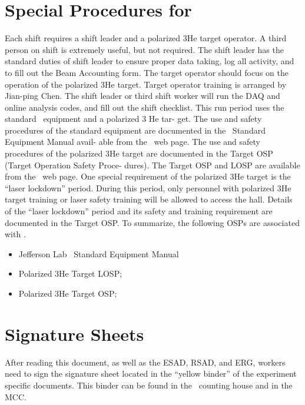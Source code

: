 %
%
\section{Special Procedures for \EXPTS}
Each shift requires a shift leader and a polarized 3He target operator. A third
person on shift is extremely useful, but not required. The shift leader has the
standard duties of shift leader to ensure proper data taking, log all activity, and
to fill out the Beam Accounting form. The target operator should focus on the
operation of the polarized 3He target. Target operator training is arranged by
Jian-ping Chen. The shift leader or third shift worker will run the DAQ and
online analysis codes, and fill out the shift checklist.
This run period uses the standard \HALL\ equipment and a polarized 3 He tar-
get. The use and safety procedures of the standard
equipment are documented in the \HALL\ Standard Equipment Manual avail-
able from the \HALL\ web page. The use and safety procedures of the polarized
3He target are documented in the Target OSP (Target Operation Safety Proce-
dures).  The Target OSP and LOSP are  available from the \HALL\ web page.
One special requirement of the polarized 3He target is the ``laser lockdown''
period. During this period, only personnel with polarized 3He target training
or laser safety training will be allowed to access the hall. Details of the ``laser
lockdown'' period and its safety and training requirement are documented in
the Target OSP.
To summarize, the following OSPs are associated with \EXPTS.

\begin{itemize}
\item Jefferson Lab \HALL\ Standard Equipment Manual
\item Polarized 3He Target LOSP;
\item Polarized 3He Target OSP;
\end{itemize}

\newpage
\section{Signature Sheets}

After reading this document, as well as the ESAD, RSAD, and ERG, workers need to sign
the signature sheet located in the ``yellow binder'' of the experiment specific documents.
This binder can be found in the \HALL\ counting house and in the MCC.


